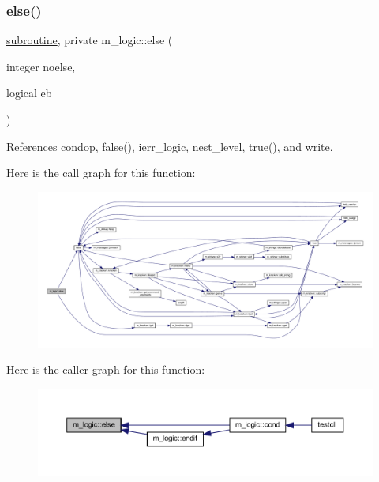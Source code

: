 \subsubsection{\texorpdfstring{else()}{else()}}
{\footnotesize\ttfamily \hyperlink{M__stopwatch_83_8txt_acfbcff50169d691ff02d4a123ed70482}{subroutine}, private m\+\_\+logic\+::else (\begin{DoxyParamCaption}\item[{integer}]{noelse,  }\item[{logical}]{eb }\end{DoxyParamCaption})\hspace{0.3cm}{\ttfamily [private]}}



References condop, false(), ierr\+\_\+logic, nest\+\_\+level, true(), and write.

Here is the call graph for this function\+:
\nopagebreak
\begin{figure}[H]
\begin{center}
\leavevmode
\includegraphics[width=350pt]{namespacem__logic_ac51075acbd12f22ae97edd87352cba67_cgraph}
\end{center}
\end{figure}
Here is the caller graph for this function\+:
\nopagebreak
\begin{figure}[H]
\begin{center}
\leavevmode
\includegraphics[width=350pt]{namespacem__logic_ac51075acbd12f22ae97edd87352cba67_icgraph}
\end{center}
\end{figure}
\mbox{\label{namespacem__logic_abb56458f58725800b593e986b23ec2d3}} 
